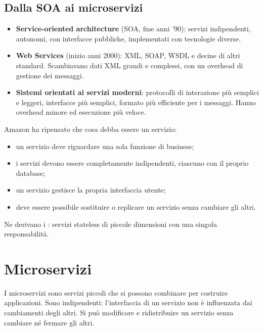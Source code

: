 \subsection*{Dalla SOA ai microservizi}

\begin{itemize}
  \item \textbf{Service-oriented architecture} (SOA, fine anni '90): servizi indipendenti, autonomi, con interfacce
    pubbliche, implementati con tecnologie diverse.
  \item \textbf{Web Services} (inizio anni 2000): XML, SOAP, WSDL e decine di altri standard. Scambiavano dati XML grandi
    e complessi, con un overhead di gestione dei messaggi.
  \item \textbf{Sistemi orientati ai servizi moderni}: protocolli di interazione più semplici e leggeri, interfacce
    più semplici, formato più efficiente per i messaggi. Hanno overhead minore ed esecuzione più veloce.
\end{itemize}

Amazon ha ripensato che cosa debba essere un servizio:
\begin{itemize}
  \item un servizio deve riguardare una sola funzione di business;
  \item i servizi devono essere completamente indipendenti, ciascuno con il proprio database;
  \item un servizio gestisce la propria interfaccia utente;
  \item deve essere possibile sostituire o replicare un servizio senza cambiare gli altri.
\end{itemize}
Ne derivano i : servizi stateless di piccole dimensioni con una singola responsabilità.

\section{Microservizi}
\label{sec:micro-microservizi}

I microservizi sono servizi piccoli che si possono combinare per costruire applicazioni. Sono indipendenti: l'interfaccia
di un servizio non è influenzata dai cambiamenti degli altri. Si può modificare e ridistribuire un servizio senza
cambiare né fermare gli altri.

